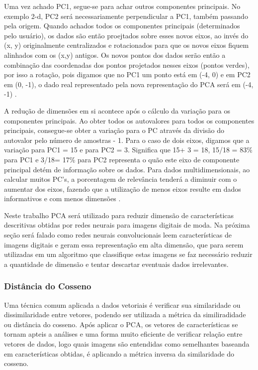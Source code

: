 \documentclass[12pt]{report}
\begin{document}
Uma vez achado PC1, segue-se para achar outros componentes principais. No exemplo 2-d, PC2 será necessariamente perpendicular a PC1, também passando pela origem. Quando achados todos os componentes principais (determinados pelo usuário), os dados são então proejtados sobre esses novos eixos, ao invés do (x, y) originalmente centralizados e rotacionados para que os novos eixos fiquem alinhados com os (x,y) antigos. Os novos pontos dos dados serão então a combinação das coordenadas dos pontos projetados nesses eixos (pontos verdes), por isso a rotação, pois digamos que no PC1 um ponto está em (-4, 0) e em PC2 em (0, -1),  o dado real representado pela nova representação do PCA será em (-4, -1) \cite{starQuest}. 

A redução de dimensões em si acontece após o cálculo da variação para os componentes principais. Ao obter todos os autovalores para todos os componentes principais, consegue-se obter a variação para o PC através da divisão do autovalor pelo número de amostras - 1. Para o caso de dois eixos, digamos que a variação para PC1 = 15 e para PC2 = 3. Significa que 15+ 3 = 18, 15/18 = 83\% para PC1 e 3/18= 17\% para PC2 representa o quão este eixo de componente principal detém de informação sobre os dados. Para dados multidimensionais, ao calcular muitos PC's, a porcentagem de relevância tenderá a diminuir com o aumentar dos eixos, fazendo que a utilização de menos eixos resulte em dados informativos e com menos dimensões \cite{starQuest}. 

Neste trabalho \ac{PCA} será utilizado para reduzir dimensão de características descritivas obtidas por redes neurais para imagens digitais de moda. Na próxima seção será falado como redes neurais convolucionais leem características de imagens digitais e geram essa representação em alta dimensão, que para serem utilizadas em um algoritmo que classifique estas imagens se faz necessário reduzir a quantidade de dimensão e tentar descartar eventuais dados irrelevantes. 

\subsubsection{Distância do Cosseno}

Uma técnica comum aplicada a dados vetoriais é verificar sua similaridade ou dissimilaridade entre vetores, podendo ser utilizada a métrica da similiradidade ou distância do cosseno. Após aplicar o PCA, os vetores de características se tornam apteis a análises e uma forma muito eficiente de verificar relação entre vetores de dados, logo quais imagens são entendidas como semelhantes baseanda em características obtidas, é aplicando a métrica inversa da similaridade do cosseno.
\end{document}

